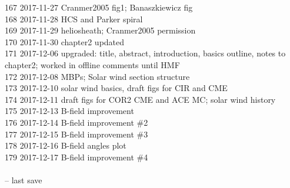 \begin{footnotesize}
167	2017-11-27	Cranmer2005 fig1; Banaszkiewicz fig\\
168	2017-11-28	HCS and Parker spiral\\
169	2017-11-29	heliosheath; Cranmer2005 permission\\
170	2017-11-30	chapter2 updated\\
171	2017-12-06	upgraded: title, abstract, introduction, basics outline, notes to chapter2; worked in offline comments until HMF\\
172	2017-12-08	MBPs; Solar wind section structure\\
173	2017-12-10	solar wind basics, draft figs for CIR and CME\\
174	2017-12-11	draft figs for COR2 CME and ACE MC; solar wind history\\
175	2017-12-13	B-field improvement\\
176	2017-12-14	B-field improvement \#2\\
177	2017-12-15	B-field improvement \#3\\
178	2017-12-16	B-field angles plot\\
179	2017-12-17	B-field improvement \#4\\
\\
\ISOToday{} \thistime{} -- last save
\end{footnotesize}

\newpage

